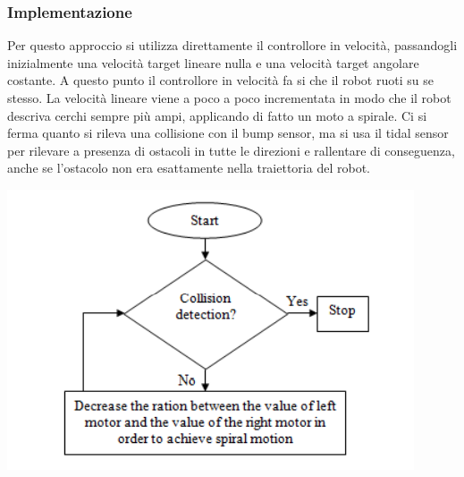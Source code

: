 \documentclass{article}
\begin{document}
\subsubsection{Implementazione}
Per questo approccio si utilizza direttamente il controllore in velocità, passandogli inizialmente una velocità target lineare nulla e una velocità target angolare costante. A questo punto il controllore in velocità fa si che il robot ruoti su se stesso. La velocità lineare viene a poco a poco incrementata in modo che il robot descriva cerchi sempre più ampi, applicando di fatto un moto a spirale.
Ci si ferma quanto si rileva una collisione con il bump sensor, ma si usa il tidal sensor per rilevare a presenza di ostacoli in tutte le direzioni e rallentare di conseguenza, anche se l'ostacolo non era esattamente nella traiettoria del robot.
\begin{center}
\includegraphics[scale=0.5]{media/schema spirale.png}
    
\end{center}
\end{document}

